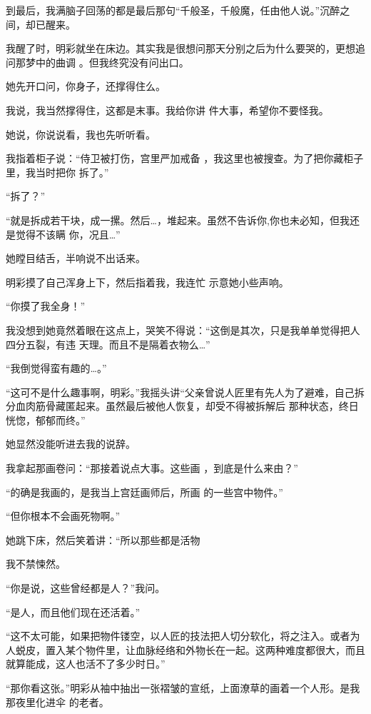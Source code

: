 \documentclass{article}
\begin{document}
到最后，我满脑子回荡的都是最后那句“千般圣，千般魔，任由他人说。”沉醉之间，却已醒来。

我醒了时，明彩就坐在床边。其实我是很想问那天分别之后为什么要哭的，更想追问那梦中的曲调
。但我终究没有问出口。 


她先开口问，你身子，还撑得住么。 

我说，我当然撑得住，这都是末事。我给你讲
件大事，希望你不要怪我。 


她说，你说说看，我也先听听看。 

我指着柜子说：“侍卫被打伤，宫里严加戒备
\newpage
，我这里也被搜查。为了把你藏柜子里，我当时把你
拆了。” 


“拆了？” 

“就是拆成若干块，成一摞。然后…，堆起来。虽然不告诉你,你也未必知，但我还是觉得不该瞒
你，况且…” 


她瞠目结舌，半响说不出话来。 

明彩摸了自己浑身上下，然后指着我，我连忙
示意她小些声响。 


“你摸了我全身！” 

我没想到她竟然着眼在这点上，哭笑不得说：“这倒是其次，只是我单单觉得把人四分五裂，有违
天理。而且不是隔着衣物么…” 


\newpage

“我倒觉得蛮有趣的…。” 

“这可不是什么趣事啊，明彩。”我摇头讲“父亲曾说人匠里有先人为了避难，自己拆分血肉筋骨藏匿起来。虽然最后被他人恢复，却受不得被拆解后
那种状态，终日恍惚，郁郁而终。” 


她显然没能听进去我的说辞。 

我拿起那画卷问：“那接着说点大事。这些画
，到底是什么来由？” 

“的确是我画的，是我当上宫廷画师后，所画
的一些宫中物件。” 


“但你根本不会画死物啊。” 

她跳下床，然后笑着讲：“所以那些都是活物


我不禁悚然。 


\newpage

“你是说，这些曾经都是人？”我问。 


“是人，而且他们现在还活着。” 

“这不太可能，如果把物件镂空，以人匠的技法把人切分软化，将之注入。或者为人蜕皮，置入某个物件里，让血脉经络和外物长在一起。这两种难度都很大，而且就算能成，这人也活不了多少时日。”

“那你看这张。”明彩从袖中抽出一张褶皱的宣纸，上面潦草的画着一个人形。是我那夜里化进伞
的老者。 
\end{document}
